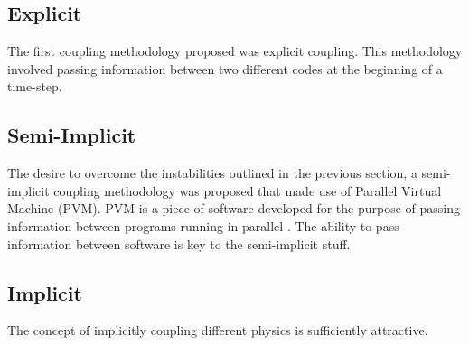 \subsection{Explicit}
\label{subsect:coupling_explicit}
The first coupling methodology proposed was explicit coupling.
This methodology involved passing information between two different codes at the beginning of a time-step.


\subsection{Semi-Implicit}
\label{subsect:coupling_semi_implicit}
The desire to overcome the instabilities outlined in the previous section, a semi-implicit coupling methodology was proposed that made use of Parallel Virtual Machine (PVM).
PVM is a piece of software developed for the purpose of passing information between programs running in parallel \cite{Geist1994}. 
The ability to pass information between software is key to the semi-implicit stuff. 

\subsection{Implicit}
\label{subsect:coupling_implicit}
The concept of implicitly coupling different physics is sufficiently attractive. 
